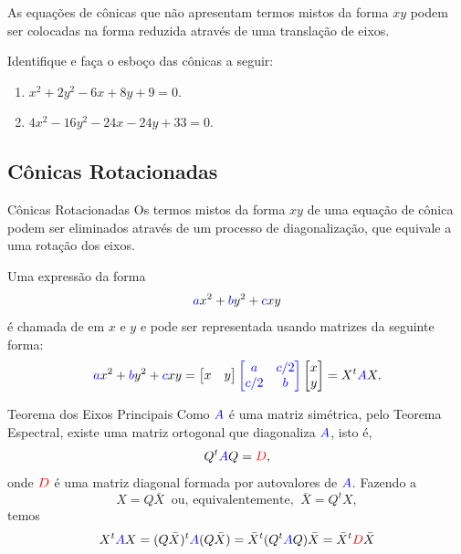\begin{frame}[label=conicas]

As equações de cônicas que não apresentam termos mistos da forma $xy$ 
podem  ser colocadas na forma reduzida através de uma translação de 
eixos.

\begin{exe}
Identifique e faça o esboço das cônicas a seguir:

\begin{enumerate}
\item $x^2+2y^2-6x+8y+9=0$.
\item $4x^2-16y^2-24x-24y+33=0$.
\end{enumerate}
\end{exe}

\end{frame}

\subsection*{Cônicas Rotacionadas}

\begin{frame}[label=conicas]{Cônicas Rotacionadas}
Os termos mistos da forma $xy$ de uma equação de cônica podem ser 
eliminados através de um processo de diagonalização, que equivale a uma 
rotação dos eixos.
\medskip

Uma expressão da forma
\[{\color{blue}a}x^2+{\color{blue}b}y^2+{\color{blue}c}xy\]
é chamada de  em $x$ e $y$ e pode ser representada 
usando matrizes da seguinte forma:
\[{\color{blue}a}x^2+{\color{blue}b}y^2+{\color{blue}c}xy=
\begin{bmatrix}
x & y
\end{bmatrix}
{\color{blue}\begin{bmatrix}
a & c/2\\ c/2 & b
\end{bmatrix}}
\begin{bmatrix}
x \\ y
\end{bmatrix}= X^t {\color{blue}A} X.
\]

\end{frame}


\begin{frame}[label=conicas]{Teorema dos Eixos Principais}
Como ${\color{blue}A}$ é uma matriz simétrica, pelo Teorema Espectral, 
existe uma matriz ortogonal que diagonaliza ${\color{blue}A}$, isto é, 
\[Q^t {\color{blue}A} Q={\color{red}D},\]
onde ${\color{red}D}$ é uma matriz diagonal formada por autovalores de 
${\color{blue}A}$.
Fazendo a  
\[X=Q\bar{X}\ \text{ ou, equivalentemente, }\  \bar{X}=Q^tX,\]
temos
\begin{equation*}
X^t {\color{blue}A} X
=(Q\bar{X})^t {\color{blue}A}(Q\bar{X})
=\bar{X}^t(Q^t {\color{blue}A}Q) \bar{X}
=\bar{X}^t{\color{red}D}\bar{X}
\end{equation*}



\end{frame}

